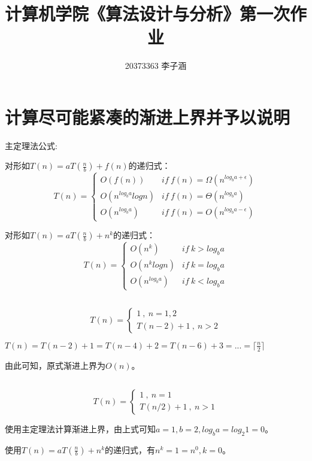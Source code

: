 \documentclass{article}
\title{ 计算机学院《算法设计与分析》第一次作业}
\author{20373363 李子涵}
\begin{document}
\maketitle

\section{计算尽可能紧凑的渐进上界并予以说明}

主定理法公式:

对形如$T(n)=aT(\frac{n}{b})+f(n)$的递归式：
$$
T(n)=\begin{cases}
O(f(n))& if\ f(n)=\Omega(n^{log_b{a+\epsilon}})\\
O(n^{log_b{a}}logn)& if\ f(n)=\Theta(n^{log_b{a}})\\
O(n^{log_b{a}})& if\ f(n)=O(n^{log_b{a-\epsilon}})
\end{cases}
$$

对形如$T(n)=aT(\frac{n}{b})+n^k$的递归式：
$$
T(n)=\begin{cases}
O(n^k)& if\ k>log_b{a}\\
O(n^{k}logn)& if\ k=log_b{a}\\
O(n^{log_b{a}})&if\ k<log_b{a}
\end{cases}
$$


\subsection{}

$$
T(n)=\left\{
\begin{array}{l}
1\ ,\ n=1,2\\
T(n-2)+1\ ,\ n>2
\end{array}
\right.
$$

$T(n)=T(n-2)+1=T(n-4)+2=T(n-6)+3=...=\lceil\frac{n}{2}\rceil$

由此可知，原式渐进上界为$O(n)$。

\subsection{}

$$
T(n)=\left\{
\begin{array}{l}
1\ ,\ n=1\\
T(n/2)+1\ ,\ n>1
\end{array}
\right.
$$

使用主定理法计算渐进上界，由上式可知$a=1,b=2,log_b a=log_{2}1=0$。

使用$T(n)=aT(\frac{n}{b})+n^k$的递归式，有$n^k=1=n^0,k=0$。
\end{document}
